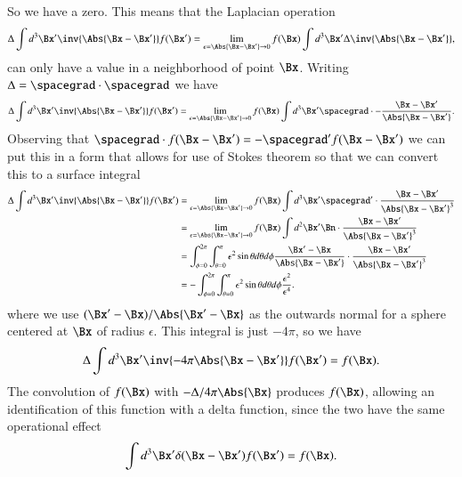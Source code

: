 %
So we have a zero.  This means that the Laplacian operation
%
\begin{equation}\label{eqn:relativisticElectrodynamicsL18:300}
\Delta \int d^3 \Bx' \inv{\Abs{\Bx - \Bx'} } f(\Bx')
=
\lim_{\epsilon = \Abs{\Bx -\Bx'} \rightarrow 0}
f(\Bx) \int d^3 \Bx' \Delta \inv{\Abs{\Bx - \Bx'}},
\end{equation}
%
can only have a value in a neighborhood of point \(\Bx\).  Writing \(\Delta = \spacegrad \cdot \spacegrad\) we have
%
\begin{equation}\label{eqn:relativisticElectrodynamicsL18:320}
\Delta \int d^3 \Bx' \inv{\Abs{\Bx - \Bx'} } f(\Bx')
=
\lim_{\epsilon = \Abs{\Bx -\Bx'} \rightarrow 0}
f(\Bx) \int d^3 \Bx' \spacegrad \cdot -\frac{\Bx - \Bx'}{\Abs{\Bx - \Bx'}}.
\end{equation}
%
Observing that \(\spacegrad \cdot f(\Bx -\Bx') = -\spacegrad' f(\Bx - \Bx')\) we can put this in a form that allows for use of Stokes theorem so that we can convert this to a surface integral
%
\begin{equation}\label{eqn:relativisticElectrodynamicsL18:820}
\begin{aligned}
\Delta \int d^3 \Bx' \inv{\Abs{\Bx - \Bx'} } f(\Bx')
&=
\lim_{\epsilon = \Abs{\Bx -\Bx'} \rightarrow 0}
f(\Bx) \int d^3 \Bx' \spacegrad' \cdot \frac{\Bx - \Bx'}{\Abs{\Bx - \Bx'}^3} \\
&=
\lim_{\epsilon = \Abs{\Bx -\Bx'} \rightarrow 0}
f(\Bx) \int d^2 \Bx' \Bn \cdot \frac{\Bx - \Bx'}{\Abs{\Bx - \Bx'}^3} \\
&= \int_{\phi=0}^{2\pi} \int_{\theta = 0}^\pi \epsilon^2 \sin\theta d\theta d\phi
\frac{\Bx' - \Bx}{\Abs{\Bx - \Bx'}} \cdot \frac{\Bx - \Bx'}{\Abs{\Bx - \Bx'}^3} \\
&= -\int_{\phi=0}^{2\pi} \int_{\theta = 0}^\pi \epsilon^2 \sin\theta d\theta d\phi \frac{\epsilon^2}{\epsilon^4}.
\end{aligned}
\end{equation}
%
where we use \((\Bx' - \Bx)/\Abs{\Bx' - \Bx}\) as the outwards normal for a sphere centered at \(\Bx\) of radius \(\epsilon\).  This integral is just \(-4 \pi\), so we have
%
\begin{equation}\label{eqn:relativisticElectrodynamicsL18:360}
\Delta \int d^3 \Bx' \inv{-4 \pi \Abs{\Bx - \Bx'} } f(\Bx')
=
f(\Bx).
\end{equation}
The convolution of \(f(\Bx)\) with \(-\Delta/4 \pi \Abs{\Bx}\) produces \(f(\Bx)\), allowing an identification of this function with a delta function, since the two have the same operational effect
\begin{equation}\label{eqn:relativisticElectrodynamicsL18:380}
\int d^3 \Bx' \delta(\Bx - \Bx') f(\Bx')
=
f(\Bx).
\end{equation}
%
